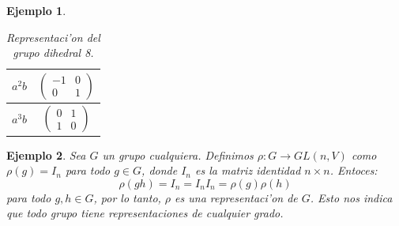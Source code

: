 \documentclass[a4paper,openright,12pt]{book}
\numberwithin{equation}{section} %
\newtheorem{ejemplo}{Ejemplo}[section] %
\begin{document}
\begin{ejemplo}
\begin{table}[H]
\begin{center}
\begin{tabular}{|c|c|}
$a^{2}b$ & $\left( \begin{array}{cc}
-1 & 0  \\
0 & 1  \end{array} \right)$ \\ \hline
$a^{3}b$ & $\left( \begin{array}{cc}
0 & 1  \\
1 & 0  \end{array} \right)$ \\ \hline
\end{tabular}
\caption{Representaci'on del grupo dihedral 8.}
\label{tabla:dihedral8}
\end{center}
\end{table}
\end{ejemplo}
\begin{ejemplo}
Sea $G$ un grupo cualquiera. Definimos $\rho : G \rightarrow GL(n,V)$ como $\rho (g)=I_{n}$ para todo $g \in G$, donde $I_{n}$ es la matriz identidad $n \times n$. Entoces:
\[
\rho (gh) = I_{n}=I_{n}I_{n}=\rho (g)  \rho (h)
\]
para todo $g,h \in G$, por lo tanto, $\rho$ es una representaci'on de $G$. Esto nos indica que todo grupo tiene representaciones de cualquier grado.
\end{ejemplo}
\end{document}

